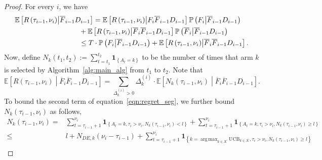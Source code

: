 \documentclass[twoside]{article}
\def\eqref#1{equation~\ref{#1}}
\def\Algref#1{Algorithm~\ref{#1}}
\def\1{\bm{1}}
\def\gK{{\mathcal{K}}}
\newcommand{\E}{\mathbb{E}}
\DeclareMathOperator*{\argmax}{arg\,max}
\theoremstyle{plain}
\theoremstyle{definition}
\theoremstyle{remark}
\begin{document}
\begin{proof}
    For every $i$, we have
    \begin{subequations}
        \begin{align}
            \E\left[R\left(\tau_{i-1},\nu_{i}\right)\middle|\overline{F}_{i-1}D_{i-1} \right] &=\E\left[R\left(\tau_{i-1},\nu_{i}\right)\middle|F_{i}\overline{F}_{i-1}D_{i-1}\right]\mathbb{P}\left(F_{i}\middle|\overline{F}_{i-1}D_{i-1}\right)\\
            &\hspace{-20pt}+\E\left[R\left(\tau_{i-1},\nu_{i}\right)\middle|\overline{F}_{i}\overline{F}_{i-1}D_{i-1}\right]\mathbb{P}\left(\overline{F}_{i}\middle|\overline{F}_{i-1}D_{i-1}\right)\\
            &\hspace{-20pt}\leq T\cdot \mathbb{P}\left(F_{i}\middle|\overline{F}_{i-1}D_{i-1}\right)+\E\left[R\left(\tau_{i-1},\nu_{i}\right)\middle|\overline{F}_{i}\overline{F}_{i-1}D_{i-1}\right]. \label{eqn:regret_seg}
        \end{align}
    \end{subequations}
    Now, define $N_{k}\left(t_{1},t_{2}\right) :=\sum^{t_{2}}_{t=t_{1}}\1_{\left\{ A_{t}=k \right\}}$ to be the number of times that arm $k$ is selected by \Algref{alg:main_alg} from $t_{1}$ to $t_{2}$. Note that  
    \begin{equation}
        \E\left[R\left(\tau_{i-1},\nu_{i}\right)\middle|\overline{F}_{i}\overline{F}_{i-1}D_{i-1}\right]=\sum_{\Delta^{\left(i\right)}_{k}>0}\Delta^{\left(i\right)}_{k}\cdot \E\left[N_{k}\left(\tau_{i-1},\nu_{i}\right)\middle|\overline{F}_{i}\overline{F}_{i-1}D_{i-1}\right].  \label{eqn:regret_decomposition}
    \end{equation}
    To bound the second term of \eqref{eqn:regret_seg}, we further bound $N_{k}\left(\tau_{i-1},\nu_{i}\right)$ as follows,
    \begin{subequations}
        \begin{align}
            N_{k}\left(\tau_{i-1},\nu_{i}\right)=&\sum^{\nu_{i}}_{t=\tau_{i-1}+1}\1_{\left\{ A_{t}=k, \tau_{i}>\nu_{i}, N_{k}\left(\tau_{i-1},\nu_{i}\right)<l\right\}}+\sum^{\nu_{i}}_{t=\tau_{i-1}+1}\1_{\left\{ A_{t}=k, \tau_{i}>\nu_{i}, N_{k}\left(\tau_{i-1},\nu_{i}\right)\geq l\right\}}\\
            \leq &l+N_{DE,k}\left(\nu_{i}-\tau_{i-1}\right)+\sum^{\nu_{i}}_{t=\tau_{i-1}+1}\1_{\left\{ k=\argmax_{k\in\gK} \mathrm{UCB}_{k\in\gK}, \tau_{i}>\nu_{i}, N_{k}\left(\tau_{i-1},\nu_{i}\right)\geq l\right\}}\\

\end{align}
\end{subequations}
\end{proof}
\end{document}
